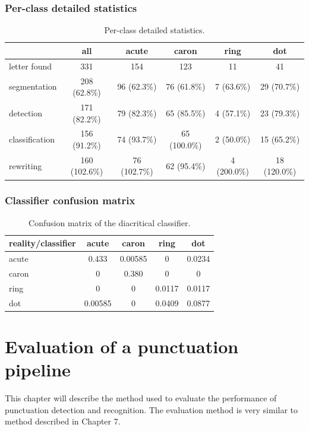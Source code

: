 \documentclass[12pt,a4paper]{report}
\begin{document}
\subsection{Per-class detailed statistics}
\begin{table}[htbp]
    \centering
    \begin{tabular}{lccccc}
        \toprule
        & all & acute & caron & ring & dot \\
        \midrule
        letter found & 331 & 154 & 123 & 11 & 41 \\
        segmentation & 208 (62.8\%) & 96 (62.3\%) & 76 (61.8\%) & 7 (63.6\%) & 29 (70.7\%) \\
        detection & 171 (82.2\%) & 79 (82.3\%) & 65 (85.5\%) & 4 (57.1\%) & 23 (79.3\%) \\
        classification & 156 (91.2\%) & 74 (93.7\%) & 65 (100.0\%) & 2 (50.0\%) & 15 (65.2\%) \\
        rewriting & 160 (102.6\%) & 76 (102.7\%) & 62 (95.4\%) & 4 (200.0\%) & 18 (120.0\%) \\
        \bottomrule
    \end{tabular}
    \caption{Per-class detailed statistics.}
    \label{tab:diacritic-perclass}
\end{table}

\subsection{Classifier confusion matrix}
\begin{table}[htbp]
    \centering
    \begin{tabular}{lcccc}
        \toprule
        reality/classifier & acute & caron & ring & dot \\
        \midrule
        acute & 0.433 & 0.00585 & 0 & 0.0234 \\
        caron & 0 & 0.380 & 0 & 0 \\
        ring & 0 & 0 & 0.0117 & 0.0117 \\
        dot & 0.00585 & 0 & 0.0409 & 0.0877 \\
        \bottomrule
    \end{tabular}
    \caption{Confusion matrix of the diacritical classifier.}
    \label{tab:diacritic-confusion}
\end{table}

\chapter{Evaluation of a punctuation pipeline}
This chapter will describe the method used to evaluate the performance of punctuation detection and recognition. The evaluation method is very similar to method described in Chapter 7.
\end{document}
